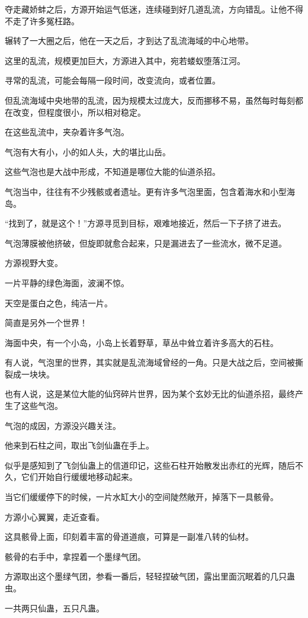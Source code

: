 \begin{this_body}
夺走藏娇蚌之后，方源开始运气低迷，连续碰到好几道乱流，方向错乱。让他不得不走了许多冤枉路。

辗转了一大圈之后，他在一天之后，才到达了乱流海域的中心地带。

这里的乱流，规模更加巨大，方源进入其中，宛若蝼蚁堕落江河。

寻常的乱流，可能会每隔一段时间，改变流向，或者位置。

但乱流海域中央地带的乱流，因为规模太过庞大，反而挪移不易，虽然每时每刻都在改变，但程度很小，所以相对稳定。

在这些乱流中，夹杂着许多气泡。

气泡有大有小，小的如人头，大的堪比山岳。

这些气泡也是大战中形成，不知道是哪位大能的仙道杀招。

气泡当中，往往有不少残骸或者遗址。更有许多气泡里面，包含着海水和小型海岛。

“找到了，就是这个！”方源寻觅到目标，艰难地接近，然后一下子挤了进去。

气泡薄膜被他挤破，但旋即就愈合起来，只是漏进去了一些流水，微不足道。

方源视野大变。

一片平静的绿色海面，波澜不惊。

天空是蛋白之色，纯洁一片。

简直是另外一个世界！

海面中央，有一个小岛，小岛上长着野草，草丛中耸立着许多高大的石柱。

有人说，气泡里的世界，其实就是乱流海域曾经的一角。只是大战之后，空间被撕裂成一块块。

也有人说，这是某位大能的仙窍碎片世界，因为某个玄妙无比的仙道杀招，最终产生了这些气泡。

气泡的成因，方源没兴趣关注。

他来到石柱之间，取出飞剑仙蛊在手上。

似乎是感知到了飞剑仙蛊上的信道印记，这些石柱开始散发出赤红的光辉，随后不久，它们开始自行缓缓地移动起来。

当它们缓缓停下的时候，一片水缸大小的空间陡然敞开，掉落下一具骸骨。

方源小心翼翼，走近查看。

这具骸骨上面，印刻着丰富的骨道道痕，可算是一副准八转的仙材。

骸骨的右手中，拿捏着一个墨绿气团。

方源取出这个墨绿气团，参看一番后，轻轻捏破气团，露出里面沉眠着的几只蛊虫。

一共两只仙蛊，五只凡蛊。


\end{this_body}
